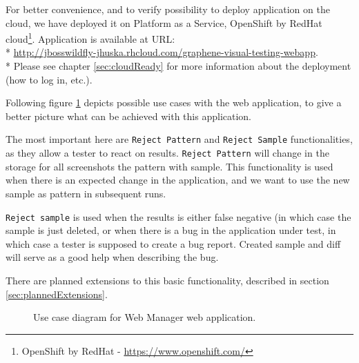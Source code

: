 \documentclass[11pt,oneside,final]{fithesis2}
\begin{document}
    For better convenience, and to verify possibility to deploy application on the cloud, we have
    deployed it on Platform as a Service, OpenShift by RedHat cloud\footnote{OpenShift by RedHat - \url{https://www.openshift.com/}}.
    Application is available at URL:\\* \url{http://jbosswildfly-jhuska.rhcloud.com/graphene-visual-testing-webapp}. 
    \\* Please see chapter \ref{sec:cloudReady} for more information about the deployment (how to log in, etc.).
    
    Following figure \ref{fig:useCaseDiagramWebManApp} depicts possible use cases with the web application, to give a better picture what can be achieved
    with this application.
    
    The most important here are \texttt{Reject Pattern} and \texttt{Reject Sample} functionalities, as they allow a tester to react
    on results. \texttt{Reject Pattern} will change in the storage for all screenshots the pattern with sample. This functionality is
    used when there is an expected change in the application, and we want to use the new sample as pattern in subsequent runs.
    
    \texttt{Reject sample} is used when the results is either false negative (in which case the sample is just deleted, or when
    there is a bug in the application under test, in which case a tester is supposed to create a bug report. Created sample and diff
    will serve as a good help when describing the bug. 
    
    There are planned extensions to this basic functionality, described in section \ref{sec:plannedExtensions}.
    
    \begin{figure}[!htb]
      \begin{center}
      \leavevmode
      \centerline{}
      \end{center}
      \caption{Use case diagram for Web Manager web application.}
      \label{fig:useCaseDiagramWebManApp}
    \end{figure}
        
\end{document}
